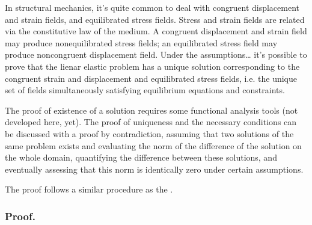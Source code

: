 \documentclass[letterpaper,10pt,english]{jupyterBook}
\begin{document}
\sphinxAtStartPar
In structural mechanics, it’s quite common to deal with congruent displacement and strain fields, and equilibrated stress fields. Stress and strain fields are related via the constitutive law of the medium. A congruent displacement and strain field may produce non\sphinxhyphen{}equilibrated stress fields; an equilibrated stress field may produce non\sphinxhyphen{}congruent displacement field. Under the assumptions… it’s possible to prove that the lienar elastic problem has a unique solution corresponding to the congruent strain and displacement and equilibrated stress fields, i.e. the unique set of fields simultaneously satisfying equilibrium equations and constraints.

\sphinxAtStartPar
The proof of existence of a solution requires some functional analysis tools (not developed here, yet). The proof of uniqueness and the necessary conditions can be discussed with a proof by contradiction, assuming that two solutions of the same problem exists and evaluating the norm of the difference of the solution on the whole domain, quantifying the difference between these solutions, and eventually assessing that this norm is identically zero under certain assumptions.

\sphinxAtStartPar
The proof follows a similar procedure as the .
\subsubsection*{Proof.}
\end{document}
